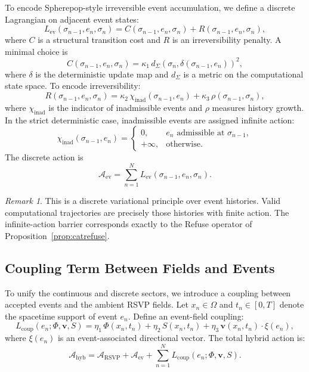 \documentclass[12pt, twoside]{article}
\theoremstyle{plain}
\theoremstyle{definition}
\theoremstyle{remark}
\newtheorem{remark}[theorem]{Remark}
\begin{document}
To encode Spherepop-style irreversible event accumulation,
we define a discrete Lagrangian on adjacent event states:
\[
  L_{\mathrm{ev}}(\sigma_{n-1}, e_n, \sigma_n)
  = C(\sigma_{n-1}, e_n, \sigma_n)
    + R(\sigma_{n-1}, e_n, \sigma_n),
\]
where $C$ is a structural transition cost and $R$ is an
irreversibility penalty.
A minimal choice is
\[
  C(\sigma_{n-1}, e_n, \sigma_n)
  = \kappa_1\, d_{\Sigma}(\sigma_n, \delta(\sigma_{n-1}, e_n))^2,
\]
where $\delta$ is the deterministic update map and $d_{\Sigma}$
is a metric on the computational state space.
To encode irreversibility:
\[
  R(\sigma_{n-1}, e_n, \sigma_n)
  = \kappa_2\,\chi_{\mathrm{inad}}(\sigma_{n-1}, e_n)
    + \kappa_3\,\rho(\sigma_{n-1},\sigma_n),
\]
where $\chi_{\mathrm{inad}}$ is the indicator of inadmissible events
and $\rho$ measures history growth.
In the strict deterministic case, inadmissible events are assigned
infinite action:
\[
  \chi_{\mathrm{inad}}(\sigma_{n-1}, e_n)
  = \begin{cases}
      0,      & e_n \text{ admissible at } \sigma_{n-1}, \\
      +\infty,& \text{otherwise.}
    \end{cases}
\]
The discrete action is
\[
  \mathcal{A}_{\mathrm{ev}}
  = \sum_{n=1}^{N} L_{\mathrm{ev}}(\sigma_{n-1}, e_n, \sigma_n).
\]

\begin{remark}
This is a discrete variational principle over event histories.
Valid computational trajectories are precisely those histories
with finite action.
The infinite-action barrier corresponds exactly to the
Refuse operator of Proposition~\ref{prop:catrefuse}.
\end{remark}

\subsection{Coupling Term Between Fields and Events}

To unify the continuous and discrete sectors, we introduce a
coupling between accepted events and the ambient RSVP fields.
Let $x_n \in \Omega$ and $t_n \in [0,T]$ denote the spacetime
support of event $e_n$.
Define an event-field coupling:
\[
  L_{\mathrm{coup}}(e_n;\Phi,\mathbf{v},S)
  = \eta_1\,\Phi(x_n,t_n)
    + \eta_2\,S(x_n,t_n)
    + \eta_3\,\mathbf{v}(x_n,t_n)\cdot\xi(e_n),
\]
where $\xi(e_n)$ is an event-associated directional vector.
The total hybrid action is:
\[
  \mathcal{A}_{\mathrm{hyb}}
  = \mathcal{A}_{\mathrm{RSVP}}
    + \mathcal{A}_{\mathrm{ev}}
    + \sum_{n=1}^{N} L_{\mathrm{coup}}(e_n;\Phi,\mathbf{v},S).
\]
\end{document}
